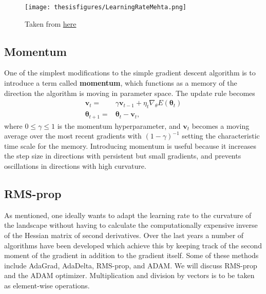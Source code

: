 \documentclass[twoside,english]{uiofysmaster}
\begin{document}
\begin{figure}
\centering
 \texttt{[image: thesisfigures/LearningRateMehta.png]}
 \caption{Taken from \href{https://deeplearning4j.org/restrictedboltzmannmachine}{here}}
 \label{fig:LearningRateMehta}
\end{figure}




\subsection{Momentum}
One of the simplest modifications to the simple gradient descent algorithm is to introduce a term called \textbf{momentum}, which functions as a memory of the direction the algorithm is moving in parameter space. The update rule becomes
\begin{align}
		\mathbf{v}_t =& \gamma \mathbf{v}_{t-1} + \eta_t \nabla_\theta E(\bm{\theta}_t) \\
		\bm{\theta}_{t+1} =& \bm{\theta}_t - \mathbf{v}_t,
\end{align}
where $0 \leq \gamma \leq 1$ is the momentum hyperparameter, and $\mathbf{v}_t$ becomes a moving average over the most recent gradients with $(1-\gamma)^{-1}$ setting the characteristic time scale for the memory. Introducing momentum is useful because it increases the step size in directions with persistent but small gradients, and prevents oscillations in directions with high curvature.



\subsection{RMS-prop}
As mentioned, one ideally wants to adapt the learning rate to the curvature of the landscape without having to calculate the computationally expensive inverse of the Hessian matrix of second derivatives. Over the last years a number of algorithms have been developed which achieve this by keeping track of the second moment of the gradient in addition to the gradient itself. Some of these methods include AdaGrad, AdaDelta, RMS-prop, and ADAM. We will discuss RMS-prop and the ADAM optimizer. Multiplication and division by vectors is to be taken as element-wise operations.
\end{document}
